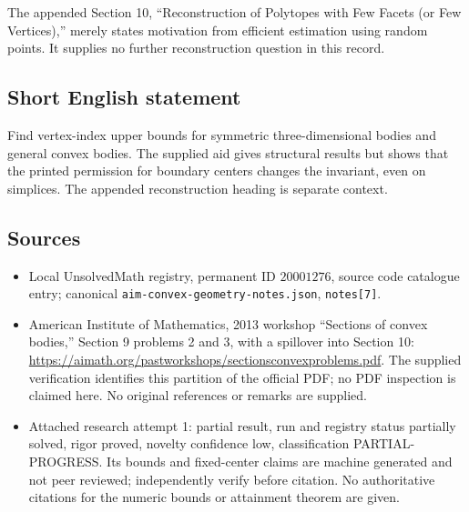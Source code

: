 \documentclass[11pt]{article}
\begin{document}
The appended Section 10, ``Reconstruction of Polytopes with Few Facets (or Few Vertices),'' merely states motivation from efficient estimation using random points. It supplies no further reconstruction question in this record.
\subsection{Short English statement}
Find vertex-index upper bounds for symmetric three-dimensional bodies and general convex bodies. The supplied aid gives structural results but shows that the printed permission for boundary centers changes the invariant, even on simplices. The appended reconstruction heading is separate context.
\subsection{Sources}
\begin{itemize}
\item Local UnsolvedMath registry, permanent ID $20001276$, source code catalogue entry; canonical \texttt{aim-convex-geometry-notes.json}, \texttt{notes[7]}.
\item American Institute of Mathematics, 2013 workshop ``Sections of convex bodies,'' Section 9 problems 2 and 3, with a spillover into Section 10: \url{https://aimath.org/pastworkshops/sectionsconvexproblems.pdf}. The supplied verification identifies this partition of the official PDF; no PDF inspection is claimed here. No original references or remarks are supplied.
\item Attached research attempt 1: partial result, run and registry status partially solved, rigor proved, novelty confidence low, classification PARTIAL-PROGRESS. Its bounds and fixed-center claims are machine generated and not peer reviewed; independently verify before citation. No authoritative citations for the numeric bounds or attainment theorem are given.
\end{itemize}
\end{document}
